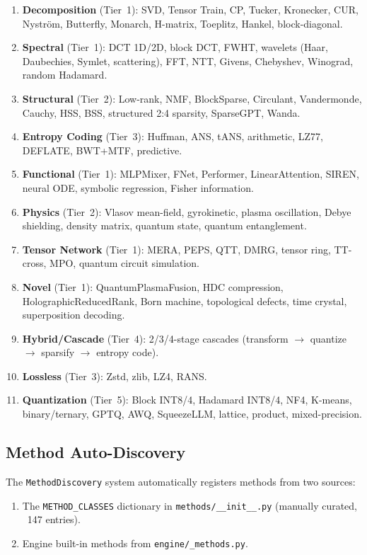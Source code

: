 \documentclass[11pt,a4paper,openright]{book}
\begin{document}
\begin{enumerate}
	\item \textbf{Decomposition} (Tier~1): SVD, Tensor Train, CP, Tucker, Kronecker, CUR, Nyström, Butterfly, Monarch, H-matrix, Toeplitz, Hankel, block-diagonal.
	\item \textbf{Spectral} (Tier~1): DCT 1D/2D, block DCT, FWHT, wavelets (Haar, Daubechies, Symlet, scattering), FFT, NTT, Givens, Chebyshev, Winograd, random Hadamard.
	\item \textbf{Structural} (Tier~2): Low-rank, NMF, BlockSparse, Circulant, Vandermonde, Cauchy, HSS, BSS, structured 2:4 sparsity, SparseGPT, Wanda.
	\item \textbf{Entropy Coding} (Tier~3): Huffman, ANS, tANS, arithmetic, LZ77, DEFLATE, BWT+MTF, predictive.
	\item \textbf{Functional} (Tier~1): MLPMixer, FNet, Performer, LinearAttention, SIREN, neural ODE, symbolic regression, Fisher information.
	\item \textbf{Physics} (Tier~2): Vlasov mean-field, gyrokinetic, plasma oscillation, Debye shielding, density matrix, quantum state, quantum entanglement.
	\item \textbf{Tensor Network} (Tier~1): MERA, PEPS, QTT, DMRG, tensor ring, TT-cross, MPO, quantum circuit simulation.
	\item \textbf{Novel} (Tier~1): QuantumPlasmaFusion, HDC compression, HolographicReducedRank, Born machine, topological defects, time crystal, superposition decoding.
	\item \textbf{Hybrid/Cascade} (Tier~4): 2/3/4-stage cascades (transform $\to$ quantize $\to$ sparsify $\to$ entropy code).
	\item \textbf{Lossless} (Tier~3): Zstd, zlib, LZ4, RANS.
	\item \textbf{Quantization} (Tier~5): Block INT8/4, Hadamard INT8/4, NF4, K-means, binary/ternary, GPTQ, AWQ, SqueezeLLM, lattice, product, mixed-precision.
\end{enumerate}

\subsection{Method Auto-Discovery}

The \texttt{MethodDiscovery} system automatically registers methods from two sources:
\begin{enumerate}
	\item The \texttt{METHOD\_CLASSES} dictionary in \texttt{methods/\_\_init\_\_.py} (manually curated, ~147 entries).
	\item Engine built-in methods from \texttt{engine/\_methods.py}.
\end{enumerate}
\end{document}
